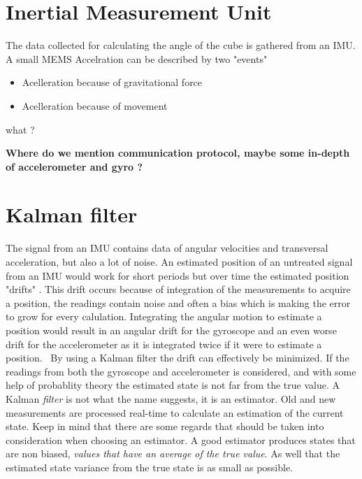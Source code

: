 \documentclass[a4paper,11pt]{kth-mag}
\begin{document}
\section{Inertial Measurement Unit}
The data collected for calculating the angle of the cube is gathered from an IMU. A small MEMS 
Accelration can be described by two "events"
\begin{itemize}
\item Acelleration because of gravitational force

\item Acelleration because of movement
\end{itemize}

what ?



\textbf{Where do we mention communication protocol, maybe some in-depth of accelerometer and gyro ? }


\section{Kalman filter}
The signal from an IMU contains data of angular velocities and transversal acceleration, but also a lot of noise. An estimated position of an untreated signal from an IMU would work for short periods but over time the estimated position "drifts" \cite{MEMSdrift}. This drift occurs because of integration of the measurements to acquire a position, the readings contain noise and often a bias which is making the  error to grow for every calulation. Integrating the angular motion to estimate a position would result in an angular drift for the gyroscope and an even worse drift for the accelerometer as it is integrated twice if it were to estimate a position.  \
By using a Kalman filter the drift can effectively be minimized. If the readings from both the gyroscope and accelerometer is considered, and with some help of probablity theory the estimated state is not far from the true value.  A Kalman \textit{filter} is not what the name suggests, it is an estimator. Old and new measurements are processed real-time to calculate an estimation of the current state.
Keep in mind that there are some regards that should be taken into consideration when choosing an estimator.
A good estimator produces states that are non biased, \emph{values that have an average  of the true value}. As well that the estimated state variance from the true state is as small as possible.\cite{Simon2001}
\end{document}
